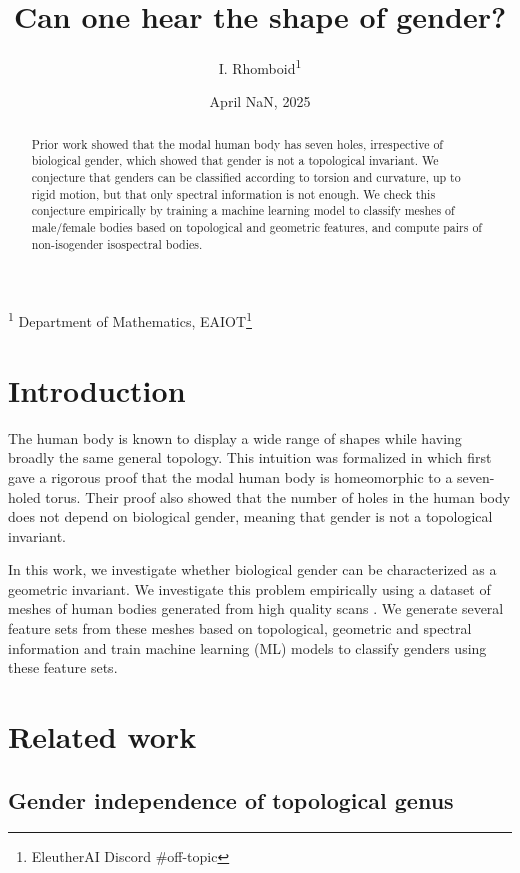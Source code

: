 \documentclass[11pt]{article}
\author{I. Rhomboid\textsuperscript{1}}
\date{April NaN, 2025}
\title{Can one hear the shape of gender?}
\begin{document}
\maketitle
{
\small
\textsuperscript{1} Department of Mathematics, EAIOT\footnote{EleutherAI Discord \#off-topic}
}

\begin{abstract}
    Prior work showed that the modal human body has seven holes, irrespective of biological gender, which showed that gender is not a topological invariant. We conjecture that genders can be classified according to torsion and curvature, up to rigid motion, but that only spectral information is not enough. We check this conjecture empirically by training a machine learning model to classify meshes of male/female bodies based on topological and geometric features, and compute pairs of non-isogender isospectral bodies.
\end{abstract}

\section{Introduction}
The human body is known to display a wide range of shapes while having broadly the same general topology. This intuition was formalized in \cite{VsauceHoles} which first gave a rigorous proof that the modal human body is homeomorphic to a seven-holed torus. Their proof also showed that the number of holes in the human body does not depend on biological gender, meaning that gender is not a topological invariant.

In this work, we investigate whether biological gender can be characterized as a geometric invariant. We investigate this problem empirically using a dataset of meshes of human bodies generated from high quality scans \cite{Yang2014}. We generate several feature sets from these meshes based on topological, geometric and spectral information and train machine learning (ML) models to classify genders using these feature sets.

\section{Related work}

\subsection{Gender independence of topological genus}
\end{document}
